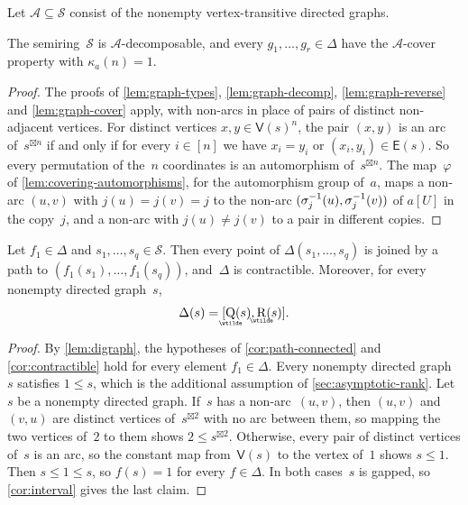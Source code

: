 \documentclass[11pt,letterpaper]{article}
\DeclareMathOperator{\asympsubrank}{\underaccent{\wtilde}{Q}}
\DeclareMathOperator{\asymprank}{\underaccent{\wtilde}{R}}
\begin{document}
Let $\mathcal{A} \subseteq \mathcal{S}$ consist of the nonempty vertex-transitive directed graphs.

\begin{lemma}\label{lem:digraph}
The semiring~$\mathcal{S}$ is $\mathcal{A}$-decomposable, and every $g_1, \ldots, g_r \in \Delta$ have the $\mathcal{A}$-cover property with $\kappa_a(n) = 1$.
\end{lemma}
\begin{proof}
The proofs of \cref{lem:graph-types}, \cref{lem:graph-decomp}, \cref{lem:graph-reverse} and \cref{lem:graph-cover} apply, with non-arcs in place of pairs of distinct non-adjacent vertices. For distinct vertices $x, y \in \mathsf{V}(s)^n$, the pair $(x,y)$ is an arc of~$s^{\boxtimes n}$ if and only if for every $i \in [n]$ we have $x_i = y_i$ or $(x_i,y_i) \in \mathsf{E}(s)$. So every permutation of the~$n$ coordinates is an automorphism of~$s^{\boxtimes n}$. The map~$\varphi$ of \cref{lem:covering-automorphisms}, for the automorphism group of~$a$, maps a non-arc $(u,v)$ with $j(u) = j(v) = j$ to the non-arc $(\sigma_j^{\smash[t]{-1}}(u), \sigma_j^{\smash[t]{-1}}(v))$ of $a[U]$ in the copy~$j$, and a non-arc with $j(u) \neq j(v)$ to a pair in different copies.
\end{proof}

\begin{corollary}\label{cor:digraph-paths}
Let $f_1 \in \Delta$ and $s_1, \ldots, s_q \in \mathcal{S}$. Then every point of $\Delta(s_1, \ldots, s_q)$ is joined by a path to $(f_1(s_1), \ldots, f_1(s_q))$, and~$\Delta$ is contractible. Moreover, for every nonempty directed graph~$s$,
\[
\Delta(s) = [\asympsubrank(s), \asymprank(s)].
\]
\end{corollary}
\begin{proof}
By \cref{lem:digraph}, the hypotheses of \cref{cor:path-connected} and \cref{cor:contractible} hold for every element $f_1 \in \Delta$. Every nonempty directed graph~$s$ satisfies $1 \leq s$, which is the additional assumption of \cref{sec:asymptotic-rank}. Let~$s$ be a nonempty directed graph. If~$s$ has a non-arc~$(u,v)$, then $(u,v)$ and $(v,u)$ are distinct vertices of~$s^{\boxtimes 2}$ with no arc between them, so mapping the two vertices of~$2$ to them shows $2 \leq s^{\boxtimes 2}$. Otherwise, every pair of distinct vertices of~$s$ is an arc, so the constant map from~$\mathsf{V}(s)$ to the vertex of~$1$ shows $s \leq 1$. Then $s \leq 1 \leq s$, so $f(s) = 1$ for every $f \in \Delta$. In both cases~$s$ is gapped, so \cref{cor:interval} gives the last claim.
\end{proof}
\end{document}
